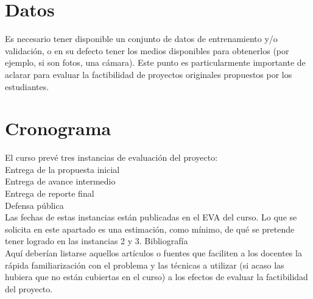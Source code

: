 \documentclass[12pt,a4paper,titlepage]{report}
\begin{document}
\section*{Datos}

Es necesario tener disponible un conjunto de datos de entrenamiento y/o validación, o en su defecto tener los medios disponibles para obtenerlos (por ejemplo, si son fotos, una cámara). Este punto es particularmente importante de aclarar para evaluar la factibilidad de proyectos originales propuestos por los estudiantes.

\section*{Cronograma}

El curso prevé tres instancias de evaluación del proyecto:\\

    Entrega de la propuesta inicial\\
    Entrega de avance intermedio\\
    Entrega de reporte final\\
    Defensa pública\\

Las fechas de estas instancias están publicadas en el EVA del curso. Lo que se solicita en este apartado es una estimación, como mínimo, de qué se pretende tener logrado en las instancias 2 y 3.
Bibliografía\\

Aquí deberían listarse aquellos artículos o fuentes que faciliten a los docentes la rápida familiarización con el problema y las técnicas a utilizar (si acaso las hubiera que no están cubiertas en el curso) a los efectos de evaluar la factibilidad del proyecto. \\
\end{document}
